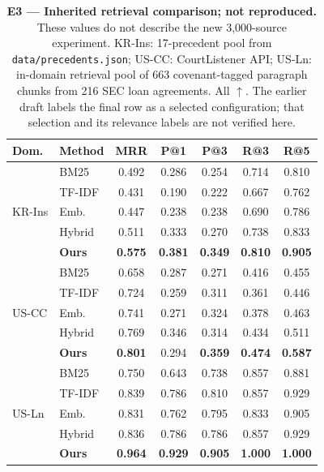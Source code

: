\documentclass[11pt]{article}
\begin{document}
\begin{table}[t]
\centering
\small
\setlength{\tabcolsep}{2pt}


\begin{tabular}{llccccc}
\toprule
Dom. & Method & MRR & P@1  & P@3 & R@3 & R@5 \\
\midrule
\multirow{5}{*}{KR-Ins}
  & BM25          & 0.492          & 0.286          & 0.254          & 0.714          & 0.810 \\
  & TF-IDF        & 0.431          & 0.190          & 0.222          & 0.667          & 0.762 \\
  & Emb.          & 0.447          & 0.238          & 0.238          & 0.690          & 0.786 \\
  & Hybrid        & 0.511          & 0.333          & 0.270          & 0.738          & 0.833 \\
  & \textbf{Ours} & \textbf{0.575} & \textbf{0.381} & \textbf{0.349} & \textbf{0.810} & \textbf{0.905} \\
\midrule
\multirow{5}{*}{US-CC}
  & BM25          & 0.658          & 0.287          & 0.271          & 0.416          & 0.455 \\
  & TF-IDF        & 0.724          & 0.259          & 0.311          & 0.361          & 0.446 \\
  & Emb.          & 0.741          & 0.271          & 0.324          & 0.378          & 0.463 \\
  & Hybrid        & 0.769          & 0.346          & 0.314          & 0.434          & 0.511 \\
  & \textbf{Ours} & \textbf{0.801} & 0.294          & \textbf{0.359} & \textbf{0.474} & \textbf{0.587} \\
\midrule
\multirow{5}{*}{US-Ln}
  & BM25          & 0.750          & 0.643          & 0.738          & 0.857          & 0.881 \\
  & TF-IDF        & 0.839          & 0.786          & 0.810          & 0.857          & 0.929 \\
  & Emb.          & 0.831          & 0.762          & 0.795          & 0.833          & 0.905 \\
  & Hybrid        & 0.836          & 0.786          & 0.786          & 0.857          & 0.929 \\
  & \textbf{Ours} & \textbf{0.964} & \textbf{0.929} & \textbf{0.905} & \textbf{1.000} & \textbf{1.000} \\
\bottomrule
\end{tabular}
\caption{\textbf{E3 --- Inherited retrieval comparison; not reproduced.}
These values do not describe the new 3,000-source experiment.
KR-Ins: 17-precedent pool from \texttt{data/precedents.json};
US-CC: CourtListener API; US-Ln: in-domain retrieval pool of 663
covenant-tagged paragraph chunks from 216 SEC loan agreements. All $\uparrow$.
The earlier draft labels the final row as a selected configuration; that
selection and its relevance labels are not verified here.}
\label{tab:e3}
\end{table}
\end{document}
